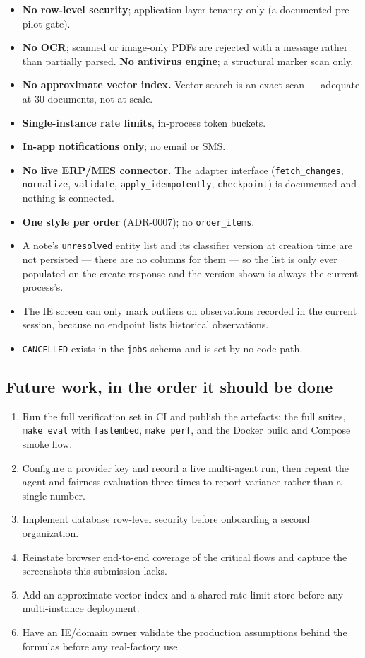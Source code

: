 \documentclass[11pt,a4paper]{article}
\begin{document}
\begin{itemize}
\item \textbf{No row-level security}; application-layer tenancy only (a
  documented pre-pilot gate).
\item \textbf{No OCR}; scanned or image-only PDFs are rejected with a message
  rather than partially parsed. \textbf{No antivirus engine}; a structural
  marker scan only.
\item \textbf{No approximate vector index.} Vector search is an exact scan ---
  adequate at 30 documents, not at scale.
\item \textbf{Single-instance rate limits}, in-process token buckets.
\item \textbf{In-app notifications only}; no email or SMS.
\item \textbf{No live ERP/MES connector.} The adapter interface
  (\texttt{fetch\_changes}, \texttt{normalize}, \texttt{validate},
  \texttt{apply\_idempotently}, \texttt{checkpoint}) is documented and nothing is
  connected.
\item \textbf{One style per order} (ADR-0007); no \texttt{order\_items}.
\item A note's \texttt{unresolved} entity list and its classifier version at
  creation time are not persisted --- there are no columns for them --- so the
  list is only ever populated on the create response and the version shown is
  always the current process's.
\item The IE screen can only mark outliers on observations recorded in the
  current session, because no endpoint lists historical observations.
\item \texttt{CANCELLED} exists in the \texttt{jobs} schema and is set by no code
  path.
\end{itemize}

\subsection{Future work, in the order it should be done}

\begin{enumerate}
\item Run the full verification set in CI and publish the artefacts: the full
  suites, \texttt{make eval} with \texttt{fastembed}, \texttt{make perf}, and the
  Docker build and Compose smoke flow.
\item Configure a provider key and record a live multi-agent run, then repeat
  the agent and fairness evaluation three times to report variance rather than a
  single number.
\item Implement database row-level security before onboarding a second
  organization.
\item Reinstate browser end-to-end coverage of the critical flows and capture the
  screenshots this submission lacks.
\item Add an approximate vector index and a shared rate-limit store before any
  multi-instance deployment.
\item Have an IE/domain owner validate the production assumptions behind the
  formulas before any real-factory use.
\end{enumerate}
\end{document}
